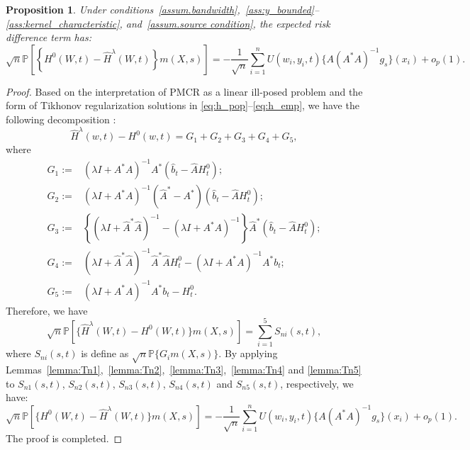 \documentclass[
  12pt]{article}
\newtheorem{proposition}{Proposition}
\begin{document}
\begin{proposition}\label{prop.expected_risk}
    Under conditions~\ref{assum.bandwidth},~\ref{ass:y_bounded}--\ref{ass:kernel_characteristic}, and~\ref{assum.source condition}, the expected risk difference term has: 
    \begin{equation*}
        \sqrt{n}\mathbb{P} \left[ \left\{ H^0(W,t) -\widehat{H}^{\lambda}(W,t) \right\} m(X,s) \right] =-\frac{1}{\sqrt{n}}\sum_{i=1}^n{U(w_i,y_i,t) \{A(A^*A)^{-1}g_s\}(x_i)}+o_{p}(1).
    \end{equation*}
\end{proposition}
\begin{proof}
   Based on the interpretation of PMCR as a linear ill-posed problem and the form of Tikhonov regularization solutions in \eqref{eq:h_pop}--\eqref{eq:h_emp}, we have the following decomposition \citep{babii2017completeness,babii2020unobservables}:
\begin{equation}\label{eq: decomposition of phi.hat}
    \widehat{H}^{\lambda}(w,t) - H^0(w,t)= G_1 + G_2 + G_3 + G_4 + G_5,
\end{equation}
where 
\begin{align}
    G_1:=& (\lambda I + A^*A)^{-1}A^* (\widehat{b}_t-\widehat{A}H^0_t); \label{eq.G1}\\
    G_2 := & (\lambda I + A^*A)^{-1}(\widehat{A}^*-A^*)(\widehat{b}_t-\widehat{A}H^0_t); \label{eq.G2} \\
    G_3 := & \left\{ (\lambda I + \widehat{A}^*\widehat{A})^{-1} -(\lambda I + A^*A)^{-1}  \right\}\widehat{A}^*(\widehat{b}_t-\widehat{A}H^0_t); \label{eq.G3}\\
    G_4:= & (\lambda I + \widehat{A}^*\widehat{A})^{-1}\widehat{A}^*\widehat{A}H^0_t-(\lambda I + A^*A)^{-1}A^*b_t; \label{eq.G4} \\
    G_5:= &(\lambda I + A^*A)^{-1}A^*b_t-H^0_t. \label{eq.G5}
\end{align}
Therefore, we have
$$
\sqrt{n}\mathbb{P}[\{\widehat{H}^{\lambda}(W,t)-H^0(W,t)\} m(X,s)] =\sum_{i=1}^5{S_{ni}(s,t)},
$$
where $S_{ni}(s,t)$ is define as $\sqrt{n}\mathbb{P} \{ G_i m(X,s) \}$. By applying Lemmas~\ref{lemma:Tn1},~\ref{lemma:Tn2},~\ref{lemma:Tn3},~\ref{lemma:Tn4} and \ref{lemma:Tn5} to $S_{n1}(s,t)$, $S_{n2}(s,t)$, $S_{n3}(s,t)$, $S_{n4}(s,t)$ and $S_{n5}(s,t)$, respectively, we have:
    $$
    \sqrt{n}\mathbb{P} [ \{ H^0(W,t) -\widehat{H}^{\lambda}(W,t)\} m(X,s) ] =-\frac{1}{\sqrt{n}}\sum_{i=1}^n{U(w_i,y_i,t) \{A(A^*A)^{-1}g_s\}(x_i)}+o_{p}(1).
    $$
    The proof is completed. 
\end{proof}
\end{document}
